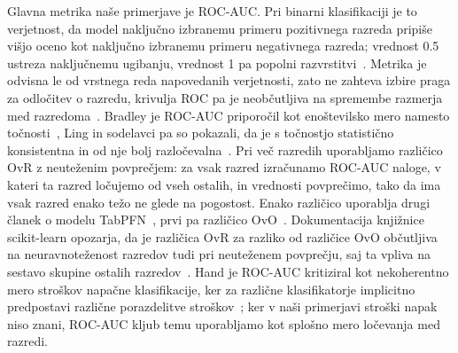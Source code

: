 \documentclass[a4paper,12pt,openright]{book}
\begin{document}
Glavna metrika naše primerjave je ROC-AUC. Pri binarni klasifikaciji je to
verjetnost, da model naključno izbranemu primeru pozitivnega razreda pripiše
višjo oceno kot naključno izbranemu primeru negativnega razreda; vrednost
\num{0.5} ustreza naključnemu ugibanju, vrednost 1 pa popolni
razvrstitvi~\cite{fawcett2006introduction}. Metrika je odvisna le od vrstnega
reda napovedanih verjetnosti, zato ne zahteva izbire praga za odločitev o
razredu, krivulja ROC pa je neobčutljiva na spremembe razmerja med
razredoma~\cite{fawcett2006introduction}. Bradley je ROC-AUC priporočil kot
enoštevilsko mero namesto točnosti~\cite{bradley1997use}, Ling in sodelavci pa
so pokazali, da je s točnostjo statistično konsistentna in od nje bolj
razločevalna~\cite{ling2003auc}. Pri več razredih uporabljamo različico OvR z
neuteženim povprečjem: za vsak razred izračunamo ROC-AUC naloge, v kateri ta
razred ločujemo od vseh ostalih, in vrednosti povprečimo, tako da ima vsak
razred enako težo ne glede na pogostost. Enako različico uporablja drugi
članek o modelu TabPFN~\cite{hollmann2025tabpfn}, prvi pa različico
OvO~\cite{hollmann2023tabpfn,hand2001simple}. Dokumentacija knjižnice
scikit-learn opozarja, da je različica OvR za razliko od različice OvO
občutljiva na neuravnoteženost razredov tudi pri neuteženem povprečju, saj ta
vpliva na sestavo skupine ostalih razredov~\cite{sklearndocsroc}. Hand je
ROC-AUC kritiziral kot nekoherentno mero stroškov napačne klasifikacije, ker za
različne klasifikatorje implicitno predpostavi različne porazdelitve
stroškov~\cite{hand2009measuring}; ker v naši primerjavi stroški napak niso
znani, ROC-AUC kljub temu uporabljamo kot splošno mero ločevanja med razredi.
\end{document}
